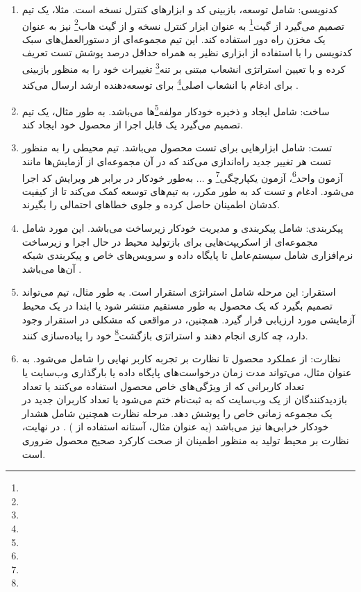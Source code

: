 \begin{enumerate}
	\item
	کدنویسی: شامل توسعه، بازبینی کد و ابزارهای کنترل نسخه است. مثلا، یک تیم تصمیم می‌گیرد از گیت\footnote{} به عنوان ابزار کنترل نسخه و از گیت هاب\footnote{} نیز به عنوان یک مخزن راه دور استفاده کند. این تیم مجموعه‌ای از دستورالعمل‌های سبک کدنویسی را با استفاده از ابزاری نظیر  به همراه حداقل درصد پوشش تست تعریف کرده و با تعیین استراتژی انشعاب مبتنی بر تنه\footnote{} تغییرات خود را به منظور بازبینی برای ادغام با انشعاب اصلی\footnote{} برای توسعه‌دهنده ارشد ارسال می‌کند \cite{Devopstrunk}.
	\item 
	ساخت: شامل ایجاد و ذخیره خودکار مولفه\footnote{}ها می‌باشد. به طور مثال، یک تیم تصمیم می‌گیرد یک  قابل اجرا از محصول خود ایجاد کند.
	\item 
	تست: شامل ابزارهایی برای تست محصول می‌باشد. تیم محیطی را به منظور تست هر تغییر جدید راه‌اندازی می‌کند که در آن مجموعه‌ای از آزمایش‌ها مانند آزمون واحد\footnote{}، آزمون یکپارچگی\footnote{} و ... به‌طور خودکار در برابر هر ویرایش کد اجرا می‌شود. ادغام و تست کد به طور مکرر، به تیم‌های توسعه کمک می‌کند تا از کیفیت کدشان اطمینان حاصل کرده و جلوی خطاهای احتمالی را بگیرند.
	\item 
	پیکربندی: شامل پیکربندی و مدیریت خودکار زیرساخت می‌باشد. این مورد شامل مجموعه‌ای از اسکریپت‌هایی برای بازتولید محیط در حال اجرا و زیرساخت نرم‌افزاری شامل سیستم‌عامل تا پایگاه داده و سرویس‌های خاص و پیکربندی شبکه آن‌ها می‌باشد \cite{DevopsIaac1, DevopsIaac2}.
	\item 
	استقرار: این مرحله شامل استراتژی استقرار است. به طور مثال، تیم می‌تواند تصمیم بگیرد که یک محصول به طور مستقیم منتشر شود یا ابتدا در یک محیط آزمایشی مورد ارزیابی قرار گیرد. همچنین، در مواقعی که مشکلی در استقرار وجود دارد، چه کاری انجام دهند و استراتژی بازگشت\footnote{} خود را پیاده‌سازی کنند.
	\item 
	نظارت: از عملکرد محصول تا نظارت بر تجربه کاربر نهایی را شامل می‌شود. به عنوان مثال، می‌تواند مدت زمان درخواست‌های پایگاه داده یا بارگذاری وب‌سایت یا تعداد کاربرانی که از ویژگی‌های خاص محصول استفاده می‌کنند یا تعداد بازدیدکنندگان از یک وب‌سایت که به ثبت‌نام ختم می‌شود یا تعداد کاربران جدید در یک مجموعه زمانی خاص را پوشش دهد. مرحله نظارت همچنین شامل هشدار خودکار خرابی‌ها نیز می‌باشد (به عنوان مثال، آستانه استفاده از ) \cite{DevopsMonitor}. در نهایت، نظارت بر محیط تولید به منظور اطمینان از صحت کارکرد صحیح محصول ضروری است.
\end{enumerate}


